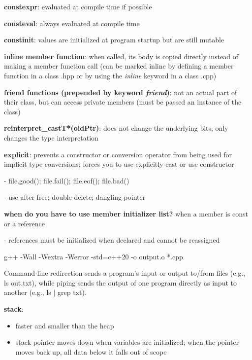\documentclass{article}
\begin{document}
\noindent
\textbf{constexpr}: evaluated at compile time if possible

\noindent
\textbf{consteval}: always evaluated at compile time

\noindent
\textbf{constinit}: values are initialized at program startup but are still mutable

\noindent
\textbf{inline member function}: when called, its body is copied directly instead of making a member function call (can be marked inline by defining a member function in a class .hpp or by using the \textit{inline} keyword in a class .cpp)

\noindent
\textbf{friend functions (prepended by keyword \textit{friend})}: not an actual part of their class, but can access private members (must be passed an instance of the class)

\noindent
\textbf{reinterpret\_cast\textlangle T*\textrangle (oldPtr)}: does not change the underlying bits; only changes the type interpretation

\noindent
\textbf{explicit}: prevents a constructor or conversion operator from being used for implicit type conversions; forces you to use explicitly cast or use constructor

\noindent
- \textlangle file\textrangle .good(); \textlangle file\textrangle .fail(); \textlangle file\textrangle .eof(); \textlangle file\textrangle .bad()

\noindent
- use after free; double delete; dangling pointer

\noindent
\textbf{when do you have to use member initializer list?} when a member is const or a reference

\noindent
- references must be initialized when declared and cannot be reassigned

\noindent
g++ -Wall -Wextra -Werror -std=c++20 -o output.o *.cpp

\noindent
Command-line redirection sends a program’s input or output to/from files (e.g., ls \textrangle out.txt), while piping sends the output of one program directly as input to another (e.g., ls $\vert$ grep txt).

\noindent
\textbf{stack}:
\begin{itemize}
    \vspace{-.8\baselineskip}
    \item faster and smaller than the heap
    \vspace{-.8\baselineskip}
    \item stack pointer moves down when variables are initialized; when the pointer moves back up, all data below it falls out of scope
    \vspace{-.8\baselineskip}
\end{itemize}
\end{document}
